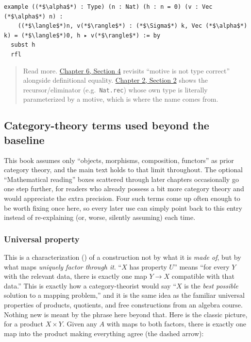 \begin{lstlisting}
example ((*$\alpha$*) : Type) (n : Nat) (h : n = 0) (v : Vec (*$\alpha$*) n) :
    ((*$\langle$*)n, v(*$\rangle$*) : (*$\Sigma$*) k, Vec (*$\alpha$*) k) = (*$\langle$*)0, h ▸ v(*$\rangle$*) := by
  subst h
  rfl
\end{lstlisting}

\begin{quote}
Read more. \hyperref[sec:06-rigor-check:04-defeq-vs-propeq:1]{Chapter 6, Section 4} revisits ``motive is not type correct'' alongside definitional equality. \hyperref[sec:02-terminology-and-coc:02-pi-sigma-and-coc:1]{Chapter 2, Section 2} shows the recursor/eliminator (e.g.~\texttt{Nat.rec}) whose own type is literally parameterized by a motive, which is where the name comes from.
\end{quote}

\subsection{Category-theory terms used beyond the baseline}\label{sec:02-terminology-and-coc:01-terminology:6}

This book assumes only ``objects, morphisms, composition, functors'' as prior category theory, and the main text holds to that limit throughout. The optional ``Mathematical reading'' boxes scattered through later chapters occasionally go one step further, for readers who already possess a bit more category theory and would appreciate the extra precision. Four such terms come up often enough to be worth fixing once here, so every later use can simply point back to this entry instead of re-explaining (or, worse, silently assuming) each time.

\subsubsection{Universal property}\label{sec:02-terminology-and-coc:01-terminology:7}

This is a characterization (\cite{MacLane1998}) of a construction not by what it is \emph{made of}, but by what maps \emph{uniquely factor through it}. ``\(X\) has property \(U\)'' means ``for every \(Y\) with the relevant data, there is exactly one map \(Y \to X\) compatible with that data.'' This is exactly how a category-theorist would say ``\(X\) is the \emph{best possible} solution to a mapping problem,'' and it is the same idea as the familiar universal properties of products, quotients, and free constructions from an algebra course. Nothing new is meant by the phrase here beyond that. Here is the classic picture, for a product \(X \times Y\). Given any \(A\) with maps to both factors, there is exactly one map into the product making everything agree (the dashed arrow):

